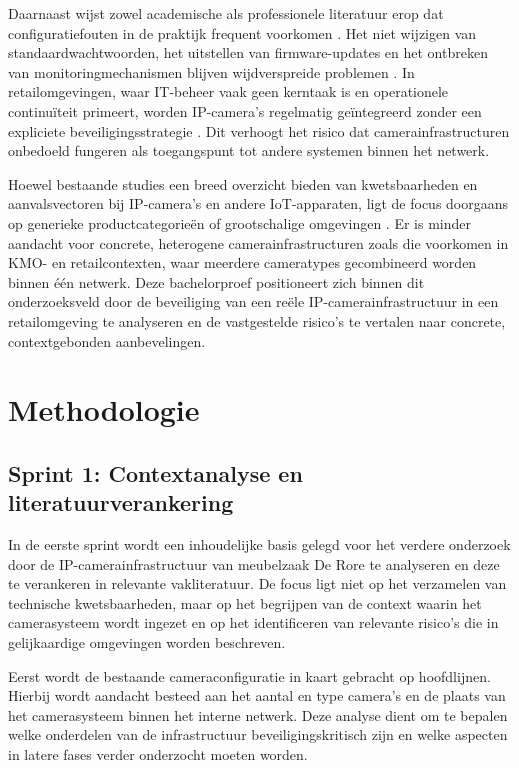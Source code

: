 Daarnaast wijst zowel academische als professionele literatuur erop dat configuratiefouten in de praktijk frequent voorkomen \parencite{ENISA2024, AlfredCamera2022}. Het niet wijzigen van standaardwachtwoorden, het uitstellen van firmware-updates en het ontbreken van monitoringmechanismen blijven wijdverspreide problemen \parencite{AlfredCamera2022}. In retailomgevingen, waar IT-beheer vaak geen kerntaak is en operationele continuïteit primeert, worden IP-camera’s regelmatig geïntegreerd zonder een expliciete beveiligingsstrategie \parencite{ENISA2024}. Dit verhoogt het risico dat camerainfrastructuren onbedoeld fungeren als toegangspunt tot andere systemen binnen het netwerk.

Hoewel bestaande studies een breed overzicht bieden van kwetsbaarheden en aanvalsvectoren bij IP-camera’s en andere IoT-apparaten, ligt de focus doorgaans op generieke productcategorieën of grootschalige omgevingen \parencite{Butun2019}. Er is minder aandacht voor concrete, heterogene camerainfrastructuren zoals die voorkomen in KMO- en retailcontexten, waar meerdere cameratypes gecombineerd worden binnen één netwerk. Deze bachelorproef positioneert zich binnen dit onderzoeksveld door de beveiliging van een reële IP-camerainfrastructuur in een retailomgeving te analyseren en de vastgestelde risico’s te vertalen naar concrete, contextgebonden aanbevelingen.

\section{Methodologie}

\subsection*{Sprint 1: Contextanalyse en literatuurverankering}

In de eerste sprint wordt een inhoudelijke basis gelegd voor het verdere onderzoek door de IP-camerainfrastructuur van meubelzaak De Rore te analyseren en deze te verankeren in relevante vakliteratuur. De focus ligt niet op het verzamelen van technische kwetsbaarheden, maar op het begrijpen van de context waarin het camerasysteem wordt ingezet en op het identificeren van relevante risico’s die in gelijkaardige omgevingen worden beschreven.

Eerst wordt de bestaande cameraconfiguratie in kaart gebracht op hoofdlijnen. Hierbij wordt aandacht besteed aan het aantal en type camera’s en de plaats van het camerasysteem binnen het interne netwerk. Deze analyse dient om te bepalen welke onderdelen van de infrastructuur beveiligingskritisch zijn en welke aspecten in latere fases verder onderzocht moeten worden.

